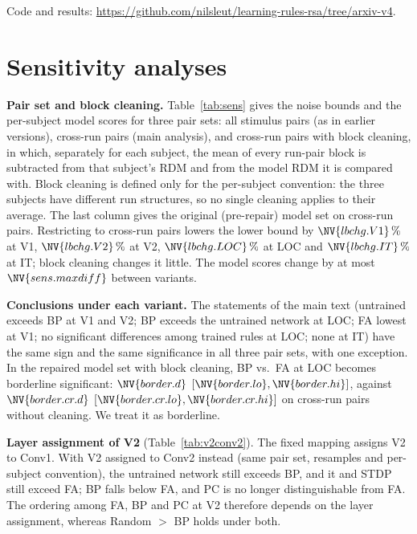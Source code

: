 \documentclass[10pt,twocolumn]{article}
\begin{document}
Code and results: \url{https://github.com/nilsleut/learning-rules-rsa/tree/arxiv-v4}.

\appendix

\section{Sensitivity analyses}

\textbf{Pair set and block cleaning.} Table~\ref{tab:sens} gives the noise bounds and the per-subject model scores for three pair sets: all stimulus pairs (as in earlier versions), cross-run pairs (main analysis), and cross-run pairs with block cleaning, in which, separately for each subject, the mean of every run-pair block is subtracted from that subject's RDM and from the model RDM it is compared with. Block cleaning is defined only for the per-subject convention: the three subjects have different run structures, so no single cleaning applies to their average. The last column gives the original (pre-repair) model set on cross-run pairs. Restricting to cross-run pairs lowers the lower bound by $\NV{lbchg.V1}\,\%$ at V1, $\NV{lbchg.V2}\,\%$ at V2, $\NV{lbchg.LOC}\,\%$ at LOC and $\NV{lbchg.IT}\,\%$ at IT; block cleaning changes it little. The model scores change by at most $\NV{sens.maxdiff}$ between variants.

\begin{table}[t]
\centering
\caption{Sensitivity: noise bounds and $\rho_{\text{subj}}$ (mean of 5 seeds) for all pairs, cross-run pairs (main), and cross-run pairs with per-subject block cleaning; repaired model set. Last column: original model set, cross-run pairs. Lower bound with stimulus-bootstrap 95\% CI. The upper bound is listed for completeness; it is not informative at $N=3$ (Methods).}
\label{tab:sens}
\small

\end{table}

\textbf{Conclusions under each variant.} The statements of the main text (untrained exceeds BP at V1 and V2; BP exceeds the untrained network at LOC; FA lowest at V1; no significant differences among trained rules at LOC; none at IT) have the same sign and the same significance in all three pair sets, with one exception. In the repaired model set with block cleaning, BP vs.\ FA at LOC becomes borderline significant: $\NV{border.d}$ $[\NV{border.lo},\NV{border.hi}]$, against $\NV{border.cr.d}$ $[\NV{border.cr.lo},\NV{border.cr.hi}]$ on cross-run pairs without cleaning. We treat it as borderline.

\textbf{Layer assignment of V2} (Table~\ref{tab:v2conv2}). The fixed mapping assigns V2 to Conv1. With V2 assigned to Conv2 instead (same pair set, resamples and per-subject convention), the untrained network still exceeds BP, and it and STDP still exceed FA; BP falls below FA, and PC is no longer distinguishable from FA. The ordering among FA, BP and PC at V2 therefore depends on the layer assignment, whereas Random $>$ BP holds under both.
\end{document}
